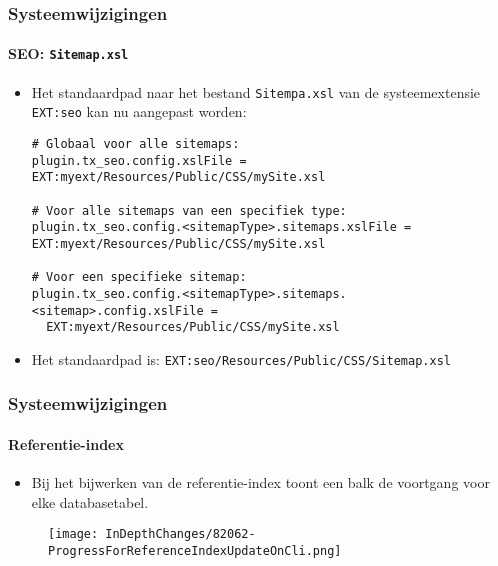 \begin{frame}[fragile]
	\frametitle{Systeemwijzigingen}
	\framesubtitle{SEO: \texttt{Sitemap.xsl}}

	\lstset{basicstyle=\tiny\ttfamily}

	\begin{itemize}
		\item Het standaardpad naar het bestand \texttt{Sitempa.xsl} van de systeemextensie
			\texttt{EXT:seo} kan nu aangepast worden:
\begin{lstlisting}
# Globaal voor alle sitemaps:
plugin.tx_seo.config.xslFile = EXT:myext/Resources/Public/CSS/mySite.xsl

# Voor alle sitemaps van een specifiek type:
plugin.tx_seo.config.<sitemapType>.sitemaps.xslFile = EXT:myext/Resources/Public/CSS/mySite.xsl

# Voor een specifieke sitemap:
plugin.tx_seo.config.<sitemapType>.sitemaps.<sitemap>.config.xslFile =
  EXT:myext/Resources/Public/CSS/mySite.xsl
\end{lstlisting}

		\item Het standaardpad is:\newline
			\smaller
				\texttt{EXT:seo/Resources/Public/CSS/Sitemap.xsl}
			\normalsize

	\end{itemize}

\end{frame}


\begin{frame}[fragile]
	\frametitle{Systeemwijzigingen}
	\framesubtitle{Referentie-index}

	\lstset{basicstyle=\tiny\ttfamily}

	\begin{itemize}
		\item Bij het bijwerken van de referentie-index toont een balk de voortgang voor elke
			databasetabel.
	\end{itemize}

	\begin{figure}
		\texttt{[image: InDepthChanges/82062-ProgressForReferenceIndexUpdateOnCli.png]}
	\end{figure}

\end{frame}

